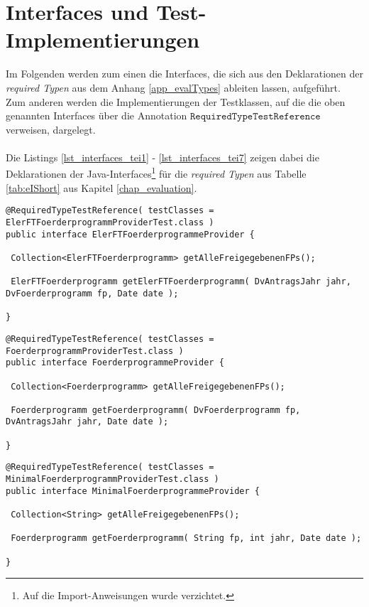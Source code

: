 \chapter{Interfaces und Test-Implementierungen}\label{app_interfacesAndTests}
Im Folgenden werden zum einen die \Gls{Interface}s, die sich aus den Deklarationen der \emph{required Typen} aus dem Anhang \ref{app_evalTypes} ableiten lassen, aufgeführt. Zum anderen werden die Implementierungen der Testklassen, auf die die oben genannten \Gls{Interface}s über die Annotation $\texttt{RequiredTypeTestReference}$ verweisen, dargelegt. 
\\\\
Die Listings \ref{lst_interfaces_tei1} - \ref{lst_interfaces_tei7} zeigen dabei die Deklarationen der Java-\Gls{Interface}s\footnote{Auf die Import-Anweisungen wurde verzichtet.} für die \emph{required Typen} aus Tabelle \ref{tab:eIShort} aus Kapitel \ref{chap_evaluation}.
\begin{lstlisting}[style = java, caption = Interface ElerFTFoerderprogrammeProvider, captionpos = b, label = lst_interfaces_tei1]
@RequiredTypeTestReference( testClasses = ElerFTFoerderprogrammProviderTest.class )
public interface ElerFTFoerderprogrammeProvider {

 Collection<ElerFTFoerderprogramm> getAlleFreigegebenenFPs();
 
 ElerFTFoerderprogramm getElerFTFoerderprogramm( DvAntragsJahr jahr, DvFoerderprogramm fp, Date date );
  
}
\end{lstlisting}
\pagebreak
\begin{lstlisting}[style = java, caption = Interface FoerderprogrammeProvider, captionpos = b, label = lst_interfaces_tei2]
@RequiredTypeTestReference( testClasses = FoerderprogrammProviderTest.class )
public interface FoerderprogrammeProvider {

 Collection<Foerderprogramm> getAlleFreigegebenenFPs();
 
 Foerderprogramm getFoerderprogramm( DvFoerderprogramm fp, DvAntragsJahr jahr, Date date );
   
}
\end{lstlisting}
\begin{lstlisting}[style = java, caption = Interface MinimalFoerderprogrammeProvider, captionpos = b, label = lst_interfaces_tei3]
@RequiredTypeTestReference( testClasses = MinimalFoerderprogrammProviderTest.class )
public interface MinimalFoerderprogrammeProvider {

 Collection<String> getAlleFreigegebenenFPs();

 Foerderprogramm getFoerderprogramm( String fp, int jahr, Date date );
  
}
\end{lstlisting}
